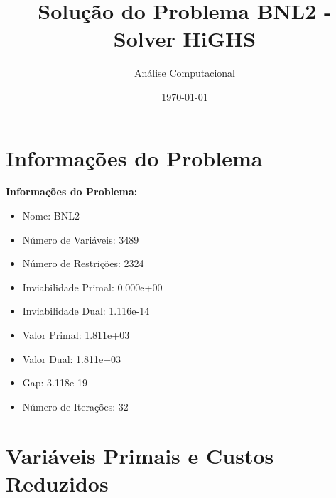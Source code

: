 \documentclass[12pt]{article}
\title{Solução do Problema BNL2 - Solver HiGHS}
\author{Análise Computacional}
\date{\today}
\begin{document}
\maketitle

\section{Informações do Problema}

\textbf{Informações do Problema:}
\begin{itemize}
\item Nome: BNL2
\item Número de Variáveis: 3489
\item Número de Restrições: 2324
\item Inviabilidade Primal: 0.000e+00
\item Inviabilidade Dual: 1.116e-14
\item Valor Primal: 1.811e+03
\item Valor Dual: 1.811e+03
\item Gap: 3.118e-19
\item Número de Iterações: 32
\end{itemize}


\section{Variáveis Primais e Custos Reduzidos}
\end{document}
